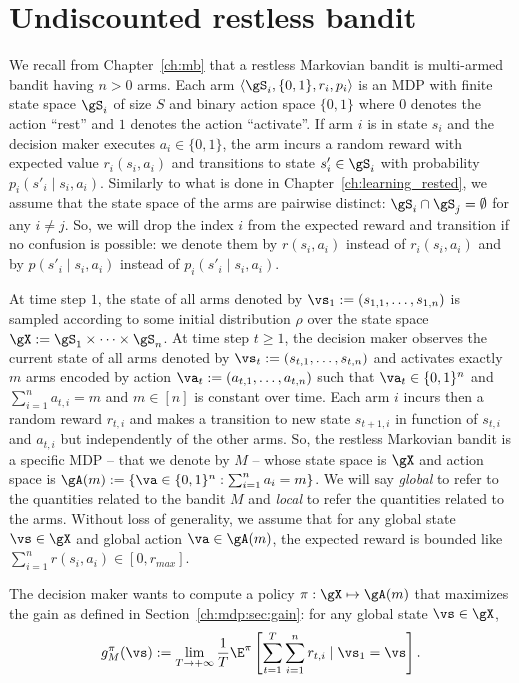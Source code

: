 \section{Undiscounted restless bandit}
\label{ch:restless:sec:restless}

We recall from Chapter~\ref{ch:mb} that a restless Markovian bandit is multi-armed bandit having $n>0$ arms.
Each arm $\langle\gS_i, \{0,1\}, r_i, p_i\rangle$ is an MDP with finite state space $\gS_i$ of size $S$ and binary action space $\{0,1\}$ where $0$ denotes the action ``rest'' and $1$ denotes the action ``activate''.
If arm $i$ is in state $s_i$ and the decision maker executes $a_i\in\{0,1\}$, the arm incurs a random reward with expected value $r_i(s_i,a_i)$ and transitions to state $s'_i\in\gS_i$ with probability $p_i(s'_i\mid s_i,a_i)$.
Similarly to what is done in Chapter~\ref{ch:learning_rested}, we assume that the state space of the arms are pairwise distinct: $\gS_i\cap\gS_j=\emptyset$ for any $i\neq j$.
So, we will drop the index $i$ from the expected reward and transition if no confusion is possible: we denote them by $r(s_i,a_i)$ instead of $r_i(s_i,a_i)$ and by $p(s'_i\mid s_i,a_i)$ instead of $p_i(s'_i\mid s_i,a_i)$.

At time step $1$, the state of all arms denoted by $\vs_1:=(s_{1,1},\dots,s_{1,n})$ is sampled according to some initial distribution $\rho$ over the state space $\gX:=\gS_1\times\dots\times\gS_n$.
At time step $t\ge1$, the decision maker observes the current state of all arms denoted by $\vs_t:=(s_{t,1},\dots,s_{t,n})$ and activates exactly $m$ arms encoded by action $\va_t:=(a_{t,1},\dots,a_{t,n})$ such that $\va_t\in\{0,1\}^n$ and $\sum_{i=1}^{n} a_{t,i}=m$ and $m\in[n]$ is constant over time.
Each arm $i$ incurs then a random reward $r_{t,i}$ and makes
a transition to new state $s_{t+1,i}$ in function of $s_{t,i}$ and $a_{t,i}$ but independently of the other arms.
So, the restless Markovian bandit is a specific MDP -- that we denote by $M$ -- whose state space is $\gX$ and action space is $\gA(m):=\{\va\in\{0,1\}^n : \sum_{i=1}^{n}a_i =m\}$.
We will say \emph{global} to refer to the quantities related to the bandit $M$ and \emph{local} to refer the quantities related to the arms.
Without loss of generality, we assume that for any global state $\vs\in\gX$ and global action $\va\in\gA(m)$, the expected reward is bounded like $\sum_{i=1}^{n}r(s_i,a_i)\in[0,r_{max}]$.

The decision maker wants to compute a policy $\pi:\gX\mapsto\gA(m)$ that maximizes the gain as defined in Section~\ref{ch:mdp:sec:gain}: for any global state $\vs\in\gX$,
\begin{equation}
    \label{ch:restless:eq:obj}
    g^\pi_M(\vs):=\lim_{T\to+\infty}\frac1T \E^\pi\left[ \sum_{t=1}^{T} \sum_{i=1}^nr_{t,i} \mid \vs_1=\vs\right].
\end{equation}

